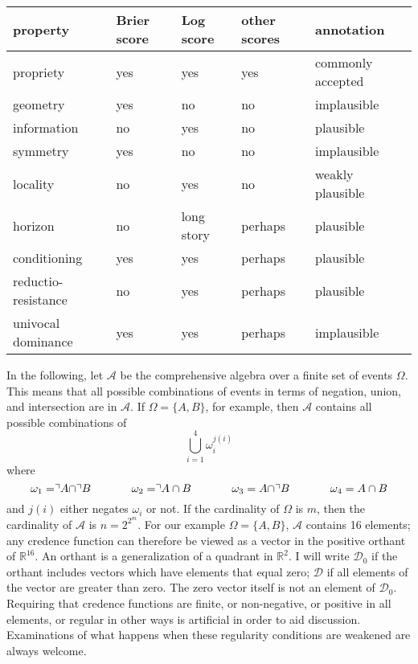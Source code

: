 \documentclass[12pt]{article}
\begin{document}
\begin{tabular}{|l|l|l|l|l|}\hline
  \textbf{property} & \textbf{Brier score} & \textbf{Log score} & \textbf{other scores} & \textbf{annotation} \\ \hline
  propriety & yes & yes & yes & commonly accepted \\ \hline
  geometry & yes & no & no & implausible \\ \hline
  information & no & yes & no & plausible \\ \hline
  symmetry & yes & no & no & implausible \\ \hline
  locality & no & yes & no & weakly plausible \\ \hline
  horizon & no & long story & perhaps & plausible \\ \hline
  conditioning & yes & yes & perhaps & plausible \\ \hline
  reductio-resistance & no & yes & perhaps & plausible \\ \hline
  univocal dominance & yes & yes & perhaps & implausible \\ \hline
\end{tabular}

\medskip

In the following, let $\mathcal{A}$ be the comprehensive algebra over
a finite set of events $\Omega$. This means that all possible
combinations of events in terms of negation, union, and intersection
are in $\mathcal{A}$. If $\Omega=\{A,B\}$, for example, then
$\mathcal{A}$ contains all possible combinations of
\begin{equation}
  \label{eq:ietoobai}
  \bigcup_{i=1}^{4}\omega_{i}^{j(i)}
\end{equation}
where 
\begin{equation}
  \label{eq:ongeefoo}
  \omega_{1}=\urcorner{}A\cap\urcorner{}B\hspace{.5in}
  \omega_{2}=\urcorner{}A\cap{}B \hspace{.5in}
  \omega_{3}=A\cap\urcorner{}B \hspace{.5in}
  \omega_{4}=A\cap{}B
\end{equation}
and $j(i)$ either negates $\omega_{i}$ or not. If the cardinality of
$\Omega$ is $m$, then the cardinality of $\mathcal{A}$ is $n=2^{{2}^{m}}$.
For our example $\Omega=\{A,B\}$, $\mathcal{A}$ contains 16 elements;
any credence function can therefore be viewed as a vector in the
positive orthant of $\mathbb{R}^{16}$. An orthant is a generalization
of a quadrant in $\mathbb{R}^{2}$. I will write $\mathcal{D}_{0}$ if
the orthant includes vectors which have elements that equal zero;
$\mathcal{D}$ if all elements of the vector are greater than zero. The
zero vector itself is not an element of $\mathcal{D}_{0}$. Requiring
that credence functions are finite, or non-negative, or positive in
all elements, or regular in other ways is artificial in order to aid
discussion. Examinations of what happens when these regularity
conditions are weakened are always welcome.
\end{document}
